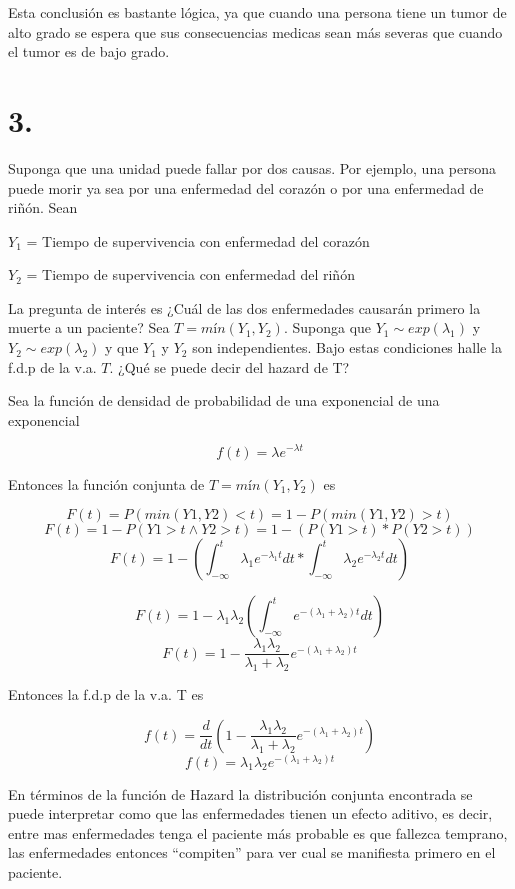 \documentclass[
]{article}
\begin{document}
Esta conclusión es bastante lógica, ya que cuando una persona tiene un
tumor de alto grado se espera que sus consecuencias medicas sean más
severas que cuando el tumor es de bajo grado.

\section {3. }

Suponga que una unidad puede fallar por dos causas. Por ejemplo, una
persona puede morir ya sea por una enfermedad del corazón o por una
enfermedad de riñón. Sean

\(Y_1\) = Tiempo de supervivencia con enfermedad del corazón

\(Y_2\) = Tiempo de supervivencia con enfermedad del riñón

La pregunta de interés es ¿Cuál de las dos enfermedades causarán primero
la muerte a un paciente? Sea \(T = mín (Y_1, Y_2)\). Suponga que
\(Y_1 \sim exp(\lambda_1)\) y \(Y_2 \sim exp(\lambda_2)\) y que \(Y_1\)
y \(Y_2\) son independientes. Bajo estas condiciones halle la f.d.p de
la v.a. \(T\). ¿Qué se puede decir del hazard de T?

Sea la función de densidad de probabilidad de una exponencial de una
exponencial

\[ f(t) = \lambda e^{-\lambda t}\]

Entonces la función conjunta de \(T = mín (Y_1, Y_2)\) es

\[ F(t) = P(min(Y1,Y2)<t) = 1- P(min(Y1,Y2)>t)\]
\[ F(t) = 1-P(Y1>t \wedge Y2>t) = 1- (P(Y1>t) * P(Y2>t))\]
\[ F(t) = 1 - \left( \int_{-\infty}^{t} \lambda_1 e^{-\lambda_1 t} dt * \int_{-\infty}^{t} \lambda_2 e^{-\lambda_2 t} dt \right)\]

\[ F(t) = 1 - \lambda_1 \lambda_2 \left( \int_{-\infty}^{t} e^{-(\lambda_1 + \lambda_2) t} dt \right)\]
\[ F(t) = 1 - \frac{\lambda_1 \lambda_2}{\lambda_1 + \lambda_2} e^{-(\lambda_1 + \lambda_2) t} \]

Entonces la f.d.p de la v.a. T es

\[f(t) = \frac{d}{dt} \left( 1 - \frac{\lambda_1 \lambda_2}{\lambda_1 + \lambda_2} e^{-(\lambda_1 + \lambda_2) t} \right)\]
\[ f(t) = \lambda_1 \lambda_2 e^{-(\lambda_1 + \lambda_2) t}\]

En términos de la función de Hazard la distribución conjunta encontrada
se puede interpretar como que las enfermedades tienen un efecto aditivo,
es decir, entre mas enfermedades tenga el paciente más probable es que
fallezca temprano, las enfermedades entonces ``compiten'' para ver cual
se manifiesta primero en el paciente.
\end{document}
